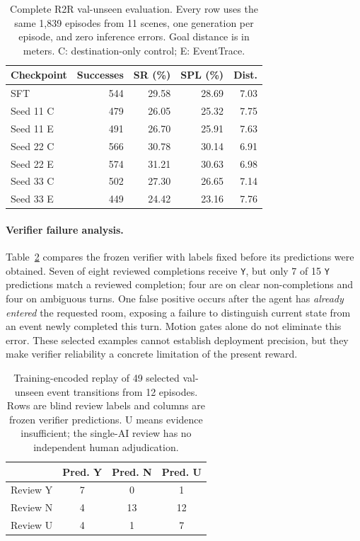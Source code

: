 \documentclass[10pt,twocolumn,letterpaper]{article}
\begin{document}
\begin{table}[t]
\centering
\caption{Complete R2R val-unseen evaluation. Every row uses the same 1,839 episodes from 11 scenes, one generation per episode, and zero inference errors. Goal distance is in meters. C: destination-only control; E: EventTrace.}
\label{tab:full}
\footnotesize
\setlength{\tabcolsep}{4pt}
\begin{tabular}{lrrrr}
\toprule
Checkpoint & Successes & SR (\%) & SPL (\%) & Dist. \\
\midrule
SFT & 544 & 29.58 & 28.69 & 7.03 \\
Seed 11 C & 479 & 26.05 & 25.32 & 7.75 \\
Seed 11 E & 491 & 26.70 & 25.91 & 7.63 \\
Seed 22 C & 566 & 30.78 & 30.14 & 6.91 \\
Seed 22 E & 574 & 31.21 & 30.63 & 6.98 \\
Seed 33 C & 502 & 27.30 & 26.65 & 7.14 \\
Seed 33 E & 449 & 24.42 & 23.16 & 7.76 \\
\bottomrule
\end{tabular}
\end{table}

\paragraph{Verifier failure analysis.} Table~\ref{tab:audit} compares the frozen verifier with labels fixed before its predictions were obtained. Seven of eight reviewed completions receive \texttt{Y}, but only 7 of 15 \texttt{Y} predictions match a reviewed completion; four are on clear non-completions and four on ambiguous turns. One false positive occurs after the agent has \emph{already entered} the requested room, exposing a failure to distinguish current state from an event newly completed this turn. Motion gates alone do not eliminate this error. These selected examples cannot establish deployment precision, but they make verifier reliability a concrete limitation of the present reward.

\begin{table}[t]
\centering
\caption{Training-encoded replay of 49 selected val-unseen event transitions from 12 episodes. Rows are blind review labels and columns are frozen verifier predictions. $\mathrm{U}$ means evidence insufficient; the single-AI review has no independent human adjudication.}
\label{tab:audit}
\small
\begin{tabular}{lccc}
\toprule
& Pred. Y & Pred. N & Pred. U \\
\midrule
Review Y & 7 & 0 & 1 \\
Review N & 4 & 13 & 12 \\
Review U & 4 & 1 & 7 \\
\bottomrule
\end{tabular}
\end{table}
\end{document}
